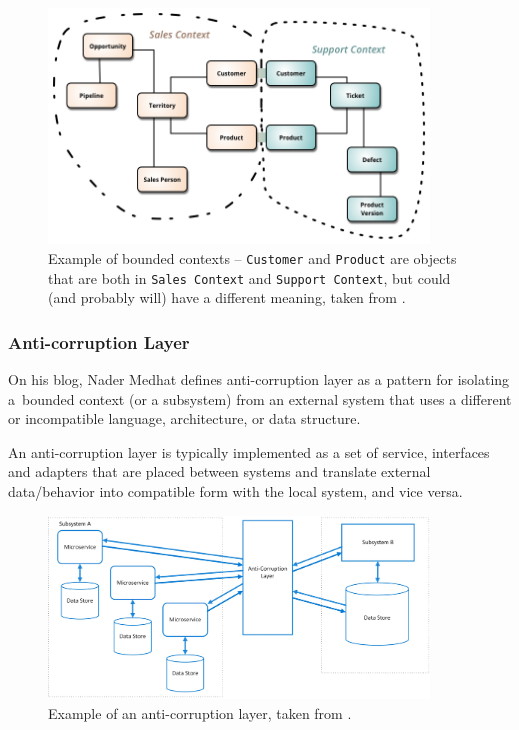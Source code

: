 \begin{figure} [H]
    \centering
    \includegraphics[width=0.9\textwidth]{figures/ddd-bc.png}
    \caption{Example of bounded contexts -- \texttt{Customer} and \texttt{Product} are objects that are both in \texttt{Sales Context} and \texttt{Support Context}, but could (and probably will) have a different meaning, taken from \cite{martin_fowler:bounded_context}.}
    \label{fig:ddd_bc}
\end{figure}

\subsubsection{Anti-corruption Layer}
On his blog, Nader Medhat \cite{nader_medhat:ddd_strategy_design} defines anti-corruption layer as a pattern for isolating a~bounded context (or a subsystem) from an external system that uses a different or incompatible language, architecture, or data structure.

An anti-corruption layer is typically implemented as a set of service, interfaces and adapters that are placed between systems and translate external data/behavior into compatible form with the local system, and vice versa.

\begin{figure} [H]
    \centering
    \includegraphics[width=0.9\textwidth]{figures/acl.png}
    \caption{Example of an anti-corruption layer, taken from \cite{nader_medhat:ddd_strategy_design}.}
    \label{fig:ddd_acl}
\end{figure}

